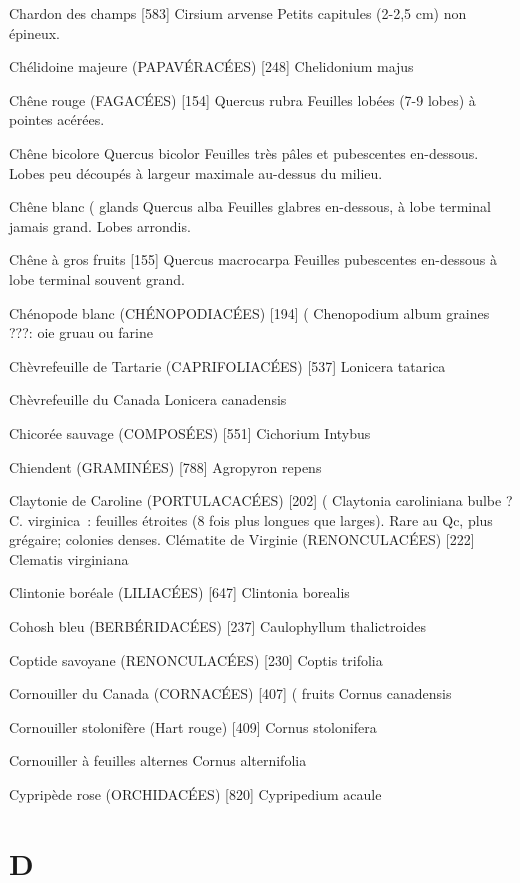 \documentclass[book,12pt,a4paper,onecolumn,openany]{memoir}
\begin{document}
Chardon des champs  [583]
				Cirsium arvense
Petits capitules (2-2,5 cm) non épineux.

Chélidoine majeure (PAPAVÉRACÉES)  [248]
				Chelidonium majus

Chêne rouge (FAGACÉES)  [154]
				Quercus rubra
Feuilles lobées (7-9 lobes) à pointes acérées.

Chêne bicolore
				Quercus bicolor
Feuilles très pâles et pubescentes en-dessous. Lobes peu découpés à largeur maximale au-dessus du milieu.

Chêne blanc							( glands
				Quercus alba
Feuilles glabres en-dessous, à lobe terminal jamais grand. Lobes arrondis.


Chêne à gros fruits  [155]
				Quercus macrocarpa
Feuilles pubescentes en-dessous à lobe terminal souvent grand.

Chénopode blanc (CHÉNOPODIACÉES)  [194]		(
				Chenopodium album			graines
???: oie							gruau ou farine

Chèvrefeuille de Tartarie (CAPRIFOLIACÉES)  [537]
				Lonicera tatarica

Chèvrefeuille du Canada 
				Lonicera canadensis

Chicorée sauvage (COMPOSÉES)  [551]
				Cichorium Intybus

Chiendent (GRAMINÉES)  [788]
				Agropyron repens

Claytonie de Caroline (PORTULACACÉES)  [202]			(
				Claytonia caroliniana			bulbe
? C. virginica : feuilles étroites (8 fois plus longues que larges).
Rare au Qc, plus grégaire; colonies denses.
Clématite de Virginie (RENONCULACÉES)  [222]
				Clematis virginiana

Clintonie boréale (LILIACÉES)  [647]
				Clintonia borealis

Cohosh bleu (BERBÉRIDACÉES)  [237]
				Caulophyllum thalictroides

Coptide savoyane (RENONCULACÉES)  [230]
				Coptis trifolia

Cornouiller du Canada (CORNACÉES)  [407]			( fruits
				Cornus canadensis

Cornouiller stolonifère (Hart rouge)  [409]
				Cornus stolonifera

Cornouiller à feuilles alternes
				Cornus alternifolia

Cypripède rose (ORCHIDACÉES)  [820]
				Cypripedium acaule

\chapter*{D}
\end{document}
